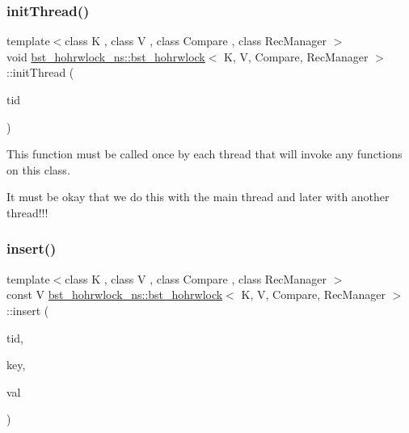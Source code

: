 \subsubsection{\texorpdfstring{init\+Thread()}{initThread()}}
{\footnotesize\ttfamily template$<$class K , class V , class Compare , class Rec\+Manager $>$ \\
void \hyperlink{classbst__hohrwlock__ns_1_1bst__hohrwlock}{bst\+\_\+hohrwlock\+\_\+ns\+::bst\+\_\+hohrwlock}$<$ K, V, Compare, Rec\+Manager $>$\+::init\+Thread (\begin{DoxyParamCaption}\item[{const int}]{tid }\end{DoxyParamCaption})\hspace{0.3cm}{\ttfamily [inline]}}

This function must be called once by each thread that will invoke any functions on this class.

It must be okay that we do this with the main thread and later with another thread!!! \mbox{\label{classbst__hohrwlock__ns_1_1bst__hohrwlock_ab8ce8a65171af6b29e7b0c13004ff3f9}} 
\subsubsection{\texorpdfstring{insert()}{insert()}}
{\footnotesize\ttfamily template$<$class K , class V , class Compare , class Rec\+Manager $>$ \\
const V \hyperlink{classbst__hohrwlock__ns_1_1bst__hohrwlock}{bst\+\_\+hohrwlock\+\_\+ns\+::bst\+\_\+hohrwlock}$<$ K, V, Compare, Rec\+Manager $>$\+::insert (\begin{DoxyParamCaption}\item[{const int}]{tid,  }\item[{const K \&}]{key,  }\item[{const V \&}]{val }\end{DoxyParamCaption})\hspace{0.3cm}{\ttfamily [inline]}}

\mbox{\label{classbst__hohrwlock__ns_1_1bst__hohrwlock_aff637e17bb37ffe790e7c644fff5ce7d}} 

